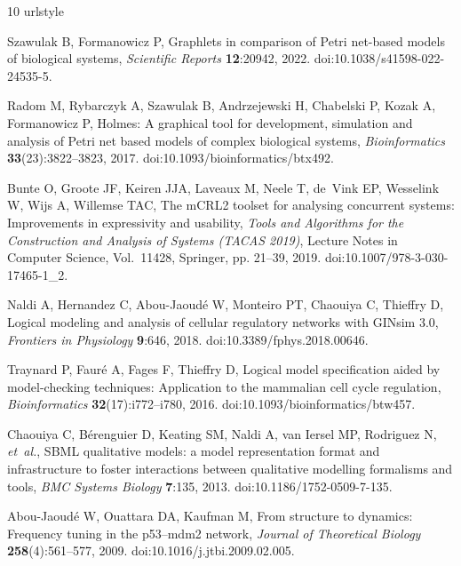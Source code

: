 \documentclass{ws-jbcb}
\numberwithin{equation}{section}
\begin{document}
\begin{thebibliography}{10}
\providecommand{\url}[1]{\texttt{#1}}
\providecommand{\urlprefix}{URL }
\expandafter\ifx\csname urlstyle\endcsname\relax
  \providecommand{\doi}[1]{doi:\discretionary{}{}{}#1}\else
  \providecommand{\doi}{doi:\discretionary{}{}{}\begingroup
  \urlstyle{rm}\Url}\fi

Szawulak B, Formanowicz P, Graphlets in comparison of {Petri} net-based models
  of biological systems, \emph{Scientific Reports} \textbf{12}:20942, 2022.
\newblock \doi{10.1038/s41598-022-24535-5}.

Radom M, Rybarczyk A, Szawulak B, Andrzejewski H, Chabelski P, Kozak A,
  Formanowicz P, Holmes: A graphical tool for development, simulation and
  analysis of {Petri} net based models of complex biological systems,
  \emph{Bioinformatics} \textbf{33}(23):3822--3823, 2017.
\newblock \doi{10.1093/bioinformatics/btx492}.

Bunte O, Groote JF, Keiren JJA, Laveaux M, Neele T, de~Vink EP, Wesselink W,
  Wijs A, Willemse TAC, The {mCRL2} toolset for analysing concurrent systems:
  Improvements in expressivity and usability,  \emph{Tools and Algorithms for
  the Construction and Analysis of Systems (TACAS 2019)}, Lecture Notes in
  Computer Science, Vol.~11428, Springer, pp. 21--39, 2019.
\newblock \doi{10.1007/978-3-030-17465-1_2}.

Naldi A, Hernandez C, Abou-Jaoud\'e W, Monteiro PT, Chaouiya C, Thieffry D,
  Logical modeling and analysis of cellular regulatory networks with {GINsim}
  3.0, \emph{Frontiers in Physiology} \textbf{9}:646, 2018.
\newblock \doi{10.3389/fphys.2018.00646}.

Traynard P, Faur\'e A, Fages F, Thieffry D, Logical model specification aided
  by model-checking techniques: Application to the mammalian cell cycle
  regulation, \emph{Bioinformatics} \textbf{32}(17):i772--i780, 2016.
\newblock \doi{10.1093/bioinformatics/btw457}.

Chaouiya C, B\'erenguier D, Keating SM, Naldi A, van Iersel MP, Rodriguez N,
  \emph{et~al.}, {SBML} qualitative models: a model representation format and
  infrastructure to foster interactions between qualitative modelling
  formalisms and tools, \emph{BMC Systems Biology} \textbf{7}:135, 2013.
\newblock \doi{10.1186/1752-0509-7-135}.

Abou-Jaoud\'e W, Ouattara DA, Kaufman M, From structure to dynamics: Frequency
  tuning in the p53--mdm2 network, \emph{Journal of Theoretical Biology}
  \textbf{258}(4):561--577, 2009.
\newblock \doi{10.1016/j.jtbi.2009.02.005}.


\end{thebibliography}
\end{document}

